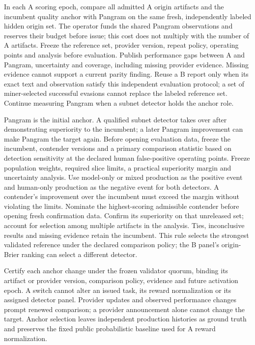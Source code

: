 In each A scoring epoch, compare all admitted A origin artifacts and
the incumbent quality anchor with Pangram on the same fresh,
independently labeled hidden origin set.
The operator funds the shared Pangram observations and reserves their
budget before issue; this cost does not multiply with the number of A
artifacts. Freeze the reference set, provider version, repeat policy,
operating points and analysis before evaluation. Publish performance
gaps between A and Pangram, uncertainty and coverage, including missing provider
evidence. Missing evidence cannot support a current parity finding.
Reuse a B report only when its exact text and observation satisfy this
independent evaluation protocol; a set of miner-selected successful
evasions cannot replace the labeled reference set. Continue measuring
Pangram when a subnet detector holds the anchor role.

Pangram is the initial anchor. A qualified subnet detector takes over
after demonstrating superiority to the incumbent; a later Pangram
improvement can make Pangram the target again. Before opening evaluation
data, freeze the incumbent, contender versions and a primary comparison
statistic based on detection sensitivity at the declared human
false-positive operating points. Freeze population weights, required
slice limits, a practical superiority margin and uncertainty analysis.
Use model-only or mixed production as the positive event and human-only
production as the negative event for both detectors. A contender's
improvement over the incumbent must exceed the margin without violating
the limits.
Nominate the highest-scoring admissible contender before opening fresh
confirmation data. Confirm its superiority on that unreleased set; account for
selection among multiple artifacts in the analysis. Ties, inconclusive
results and missing evidence retain the incumbent. This rule selects
the strongest validated reference under the declared comparison policy;
the B panel's origin-Brier ranking can select a different detector.

Certify each anchor change under the frozen validator quorum, binding
its artifact or provider version, comparison policy, evidence and future
activation epoch. A switch cannot alter an issued task, its reward
normalization or its assigned detector panel. Provider updates and
observed performance changes prompt renewed comparison; a provider
announcement alone cannot change the target. Anchor selection leaves
independent production histories as ground truth and preserves the
fixed public probabilistic baseline used for A reward normalization.

